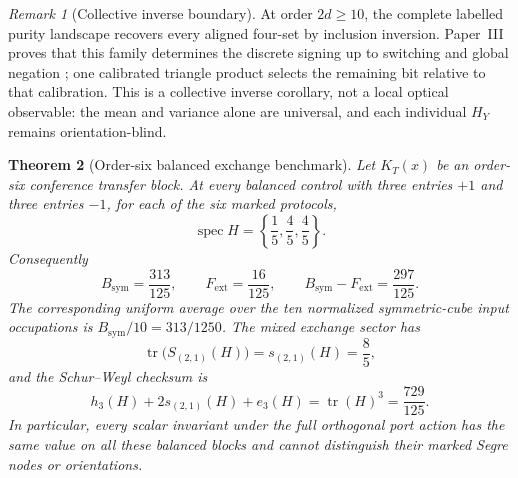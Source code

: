 \documentclass[11pt]{article}
\newtheorem{theorem}{Theorem}[section]
\theoremstyle{remark}
\newtheorem{remark}[theorem]{Remark}
\begin{document}
\begin{remark}[Collective inverse boundary]
At order \(2d\geq10\), the complete labelled purity landscape recovers every
aligned four-set by inclusion inversion.  Paper~III proves that this family
determines the discrete signing up to switching and global negation
\cite[Theorem~5.2]{ClebschIII}; one calibrated triangle product selects the
remaining bit relative to that calibration.  This is a collective inverse
corollary, not a local optical observable: the mean and variance alone are
universal, and each individual \(H_Y\) remains orientation-blind.
\end{remark}

\begin{theorem}[Order-six balanced exchange benchmark]
\label{thm:exchange-boundary}
Let \(K_T(x)\) be an order-six conference transfer block.  At every balanced control with
three entries \(+1\) and three entries \(-1\), for each of the six marked
protocols,
\[
 \operatorname{spec}H=\left\{\frac15,\frac45,\frac45\right\}.
\]
Consequently
\[
 B_{\mathrm{sym}}=\frac{313}{125},\qquad
 F_{\mathrm{ext}}=\frac{16}{125},\qquad
 B_{\mathrm{sym}}-F_{\mathrm{ext}}=\frac{297}{125}.
\]
The corresponding uniform average over the ten normalized symmetric-cube
input occupations is \(B_{\mathrm{sym}}/10=313/1250\).
The mixed exchange sector has
\[
 \operatorname{tr}\bigl(S_{(2,1)}(H)\bigr)=s_{(2,1)}(H)=\frac85,
\]
and the Schur--Weyl checksum is
\[
 h_3(H)+2s_{(2,1)}(H)+e_3(H)
 =\operatorname{tr}(H)^3=\frac{729}{125}.
\]
In particular, every scalar invariant under the full orthogonal port action
has the same value on all these balanced blocks and cannot distinguish their
marked Segre nodes or orientations.
\end{theorem}
\end{document}
